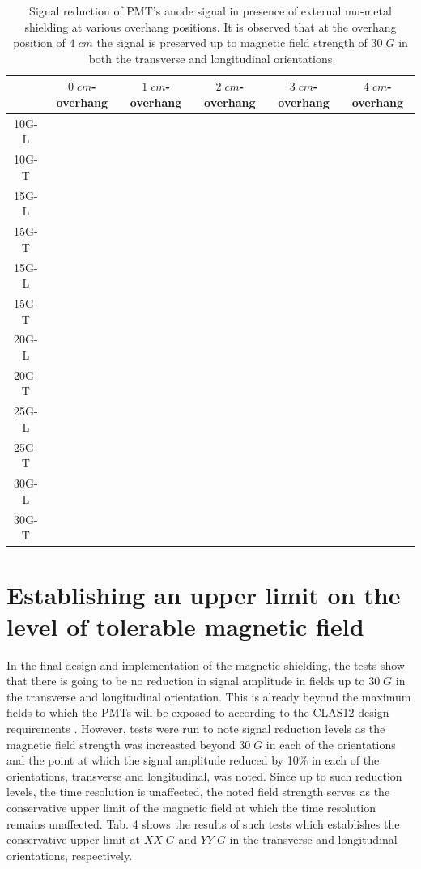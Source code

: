 \documentclass[12pt]{article}
\begin{document}
\begin{table}[H]
	\begin{center}
		\begin{tabular}{|c|c|c|c|c|c|}
			\hline
	 		& $0\;cm$-overhang & $1\;cm$-overhang & $2\;cm$-overhang & $3\;cm$-overhang & $4\;cm$-overhang \\
			\hline
 			10G-L & & & & & \\
 			10G-T & & & & & \\ 
 			\hline
 			15G-L & & & & & \\
 			15G-T & & & & & \\
 			\hline
 			15G-L & & & & & \\
 			15G-T & & & & & \\
 			\hline
 			20G-L & & & & & \\
 			20G-T & & & & & \\
 			\hline
 			25G-L & & & & & \\
 			25G-T & & & & &\\
 			\hline
 			30G-L & & & & & \\
 			30G-T & & & & & \\
 			\hline
		\end{tabular}
	\end{center}
	\caption{Signal reduction of PMT's anode signal in presence of external mu-metal shielding at various overhang positions. It is observed that at the overhang position of $4\;cm$ the signal is preserved up to magnetic field strength of $30\;G$ in both the transverse and longitudinal orientations}
\end{table}


\section{Establishing an upper limit on the level of tolerable magnetic field} In the final design and implementation of the magnetic shielding, the tests show that there is going to be no reduction in signal amplitude in fields up to $30\;G$ in the transverse and longitudinal orientation. This is already beyond the maximum fields to which the PMTs will be exposed to according to the CLAS12 design requirements \cite{CLAS12FTOFstudies}. However, tests were run to note signal reduction levels as the magnetic field strength was increasted beyond $30\;G$ in each of the orientations and the point at which the signal amplitude reduced by 10\% in each of the orientations, transverse and longitudinal, was noted. Since up to such reduction levels, the time resolution is unaffected, the noted field strength serves as the conservative upper limit of the magnetic field at which the time resolution remains unaffected. Tab. 4 shows the results of such tests which establishes the conservative upper limit at $XX\;G$ and $YY\;G$ in the transverse and longitudinal orientations, respectively.
\end{document}
